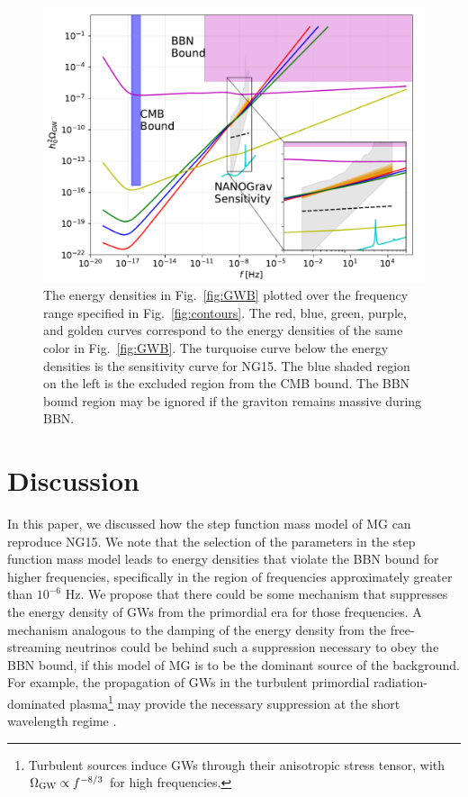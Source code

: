 \documentclass[prd,twocolumn,aps,psfig,nofootinbib,nobibnotes,superscriptaddress,preprintnumbers,times]{revtex4-2}
\begin{document}
\begin{figure}[ht]
    \includegraphics[width=\linewidth]{fig4.pdf}
    \caption{The energy densities in Fig.\ \ref{fig:GWB} plotted over the frequency range specified in Fig.\ \ref{fig:contours}. The red, blue, green, purple, and golden curves correspond to the energy densities of the same color in Fig.\ \ref{fig:GWB}. The turquoise curve below the energy densities is the sensitivity curve for NG15. The blue shaded region on the left is the excluded region from the CMB bound. The BBN bound region may be ignored if the graviton remains massive during BBN.} 
    \label{fig:supp}
\end{figure}

\section{Discussion}\label{sec:discussion}
In this paper, we discussed how the step function mass model of MG can reproduce NG15. We note that the selection of the parameters in the step function mass model leads to energy densities that violate the BBN bound for higher frequencies, specifically in the region of frequencies approximately greater than $10^{-6}$ Hz. We propose that there could be some mechanism that suppresses the energy density of GWs from the primordial era for those frequencies. A mechanism analogous to the damping of the energy density from the free-streaming neutrinos \cite{Durrer:1997ta,Weinberg:2003ur} could be behind such a suppression necessary to obey the BBN bound, if this model of MG is to be the dominant source of the background. For example, the propagation of GWs in the turbulent primordial radiation-dominated plasma\footnote{Turbulent sources induce GWs through their anisotropic stress tensor, with $\Omega_{\rm GW} \propto f^{-8/3}$ for  high frequencies.} \cite{RoperPol:2019wvy} may provide the necessary suppression at the short wavelength regime \cite{Deryagin:1986}. 
\end{document}
